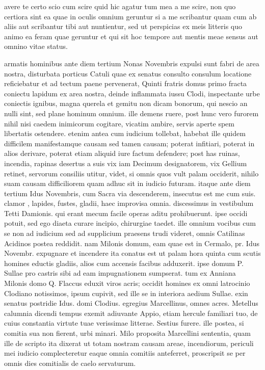 


 avere te certo scio cum scire quid hic agatur tum mea a me scire, non quo certiora sint ea quae in oculis omnium geruntur si a me scribantur quam cum ab aliis aut scribantur tibi aut nuntientur, sed ut perspicias ex meis litteris quo animo ea feram quae geruntur et qui sit hoc tempore aut mentis meae sensus aut omnino vitae status.

 armatis hominibus ante diem tertium Nonas Novembris expulsi sunt fabri de area nostra, disturbata porticus Catuli quae ex senatus consulto consulum locatione reficiebatur et ad tectum paene pervenerat, Quinti fratris domus primo fracta coniectu lapidum ex area nostra, deinde inflammata iussu Clodi, inspectante urbe coniectis ignibus, magna querela et gemitu non dicam bonorum, qui nescio an nulli sint, sed plane hominum omnium. ille demens ruere, post hunc vero furorem nihil nisi caedem inimicorum cogitare, vicatim ambire, servis aperte spem libertatis ostendere. etenim antea cum iudicium tollebat, habebat ille quidem difficilem manifestamque causam sed tamen causam; poterat infitiari, poterat in alios derivare, poterat etiam aliquid iure factum defendere; post has ruinas, incendia, rapinas desertus a suis vix iam Decimum designatorem, vix Gellium retinet, servorum consiliis utitur, videt, si omnis quos vult palam occiderit, nihilo suam causam difficiliorem quam adhuc sit in iudicio futuram. itaque ante diem tertium Idus Novembris, cum Sacra via descenderem, insecutus est me cum suis. clamor , lapides, fustes, gladii, haec improvisa omnia. discessimus in vestibulum Tetti Damionis. qui erant mecum facile operas aditu prohibuerunt. ipse occidi potuit, sed ego diaeta curare incipio, chirurgiae taedet. ille omnium vocibus cum se non ad iudicium sed ad supplicium praesens trudi videret, omnis Catilinas Acidinos postea reddidit. nam Milonis domum, eam quae est in Cermalo, pr. Idus Novembr. expugnare et incendere ita conatus est ut palam hora quinta cum scutis homines eductis gladiis, alios cum accensis facibus adduxerit. ipse domum P. Sullae pro castris sibi ad eam impugnationem sumpserat. tum ex Anniana Milonis domo Q. Flaccus eduxit viros acris; occidit homines ex omni latrocinio Clodiano notissimos, ipsum cupivit, sed ille se in interiora aedium Sullae. exin senatus postridie Idus. domi Clodius. egregius Marcellinus, omnes acres. Metellus calumnia dicendi tempus exemit adiuvante Appio, etiam hercule familiari tuo, de cuius constantia virtute tuae verissimae litterae. Sestius furere. ille postea, si comitia sua non fierent, urbi minari. Milo proposita Marcellini sententia, quam ille de scripto ita dixerat ut totam nostram causam areae, incendiorum, periculi mei iudicio complecteretur eaque omnia comitiis anteferret, proscripsit se per omnis dies comitialis de caelo servaturum.

